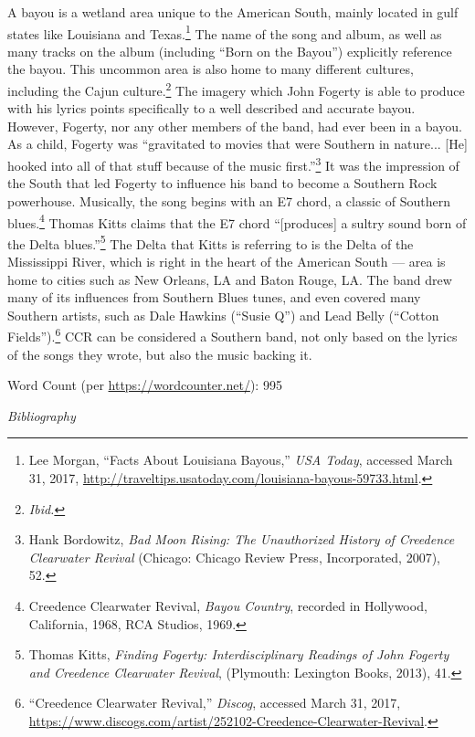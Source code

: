 \documentclass[10pt]{article}
\begin{document}
\doublespacing
\noindent A bayou is a wetland area unique to the American South, mainly located in gulf states like Louisiana and Texas.\footnote{Lee Morgan, ``Facts About Louisiana Bayous,'' \textit{USA Today}, accessed March 31, 2017, \url{http://traveltips.usatoday.com/louisiana-bayous-59733.html}.}  The name of the song and album, as well as many tracks on the album (including ``Born on the Bayou'') explicitly reference the bayou. This uncommon area is also home to many different cultures, including the Cajun culture.\footnote{\textit{Ibid.}} The imagery which John Fogerty is able to produce with his lyrics points specifically to a well described and accurate bayou. However, Fogerty, nor any other members of the band, had ever been in a bayou. As a child, Fogerty was ``gravitated to movies that were Southern in nature... [He] hooked into all of that stuff because of the music first.''\footnote{Hank Bordowitz, \textit{Bad Moon Rising: The Unauthorized History of Creedence Clearwater Revival} (Chicago: Chicago Review Press, Incorporated, 2007), 52.} It was the impression of the South that led Fogerty to influence his band to become a Southern Rock powerhouse. Musically, the song begins with an E7 chord, a classic of Southern blues.\footnote{Creedence Clearwater Revival, \textit{Bayou Country}, recorded in Hollywood, California, 1968, RCA Studios, 1969.} Thomas Kitts claims that the E7 chord ``[produces] a sultry sound born of the Delta blues.''\footnote{Thomas Kitts, \textit{Finding Fogerty: Interdisciplinary Readings of John Fogerty and Creedence Clearwater Revival}, (Plymouth: Lexington Books, 2013), 41.} The Delta that Kitts is referring to is the Delta of the Mississippi River, which is right in the heart of the American South --- area is home to cities such as New Orleans, LA and Baton Rouge, LA. The band drew many of its influences from Southern Blues tunes, and even covered many Southern artists, such as Dale Hawkins (``Susie Q'') and Lead Belly (``Cotton Fields'').\footnote{``Creedence Clearwater Revival,'' \textit{Discog}, accessed March 31, 2017, \url{https://www.discogs.com/artist/252102-Creedence-Clearwater-Revival}.} CCR can be considered a Southern band, not only based on the lyrics of the songs they wrote, but also the music backing it.

\vfill
Word Count (per \url{https://wordcounter.net/}): 995

\newpage
\singlespacing
\begin{center}
\textit{{\large Bibliography}}
\end{center}
\end{document}
